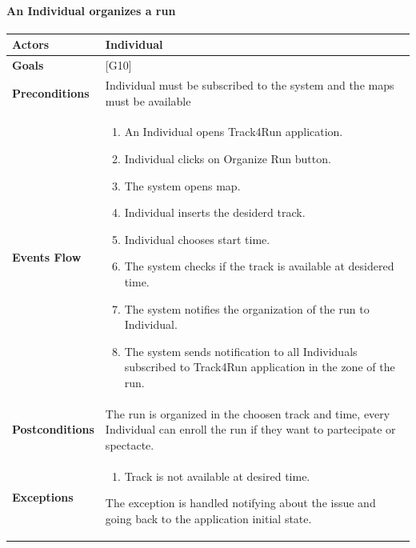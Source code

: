\documentclass[12pt]{article}
\begin{document}
\newpage
\paragraph{An Individual organizes a run} 
\begin{center}
    \begin{tabular} { |p{}|p{}| }
         \hline
         \textbf{Actors} & Individual \\ 
         \hline
         \textbf{Goals} & {[G10]} \\ 
         \hline  
         \textbf{Preconditions} & Individual must be subscribed to the system and the maps must be available \\ 
         \hline
         \textbf{Events Flow} & \begin{enumerate}[topsep=0pt]
             \setlength{\itemsep}{0.5pt}
             \item An Individual opens Track4Run application. 
             \item Individual clicks on Organize Run button. 
             \item The system opens map.
             \item Individual inserts the desiderd track. 
             \item Individual chooses start time.
             \item The system checks if the track is available at desidered time. 
             \item The system notifies the organization of the run to Individual. 
             \item The system sends notification to all Individuals subscribed to Track4Run application in the zone of the run. 
             \end{enumerate} \\ 
        \hline
        \textbf{Postconditions} & The run is organized in the choosen track and time, every Individual can enroll the run if they want to partecipate or spectacte. \\ 
        \hline 
         \textbf{Exceptions} & \begin{enumerate}[topsep=0pt] 
              \setlength{\itemsep}{0.5pt}
              \item Track is not available at desired time. 
              \end{enumerate} 
            The exception is handled notifying about the issue and going back to the application initial state. \\ 
            \hline
    \end{tabular}
\end{center}
\newpage
\end{document}
